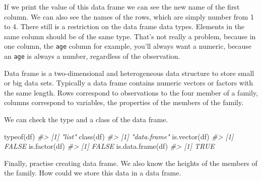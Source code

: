 \documentclass[
]{book}
\newenvironment{Shaded}{\begin{snugshade}}{\end{snugshade}}
\newcommand{\AttributeTok}[1]{\textcolor[rgb]{0.77,0.63,0.00}{#1}}
\newcommand{\CommentTok}[1]{\textcolor[rgb]{0.56,0.35,0.01}{\textit{#1}}}
\newcommand{\DecValTok}[1]{\textcolor[rgb]{0.00,0.00,0.81}{#1}}
\newcommand{\FloatTok}[1]{\textcolor[rgb]{0.00,0.00,0.81}{#1}}
\newcommand{\FunctionTok}[1]{\textcolor[rgb]{0.00,0.00,0.00}{#1}}
\newcommand{\NormalTok}[1]{#1}
\newcommand{\OtherTok}[1]{\textcolor[rgb]{0.56,0.35,0.01}{#1}}
\begin{document}
If we print the value of this data frame we can see the new name of the first column. We can also see the names of the rows, which are simply number from 1 to 4. There still is a restriction on the data frame data types. Elements in the same column should be of the same type. That's not really a problem, because in one column, the \texttt{age} column for example, you'll always want a numeric, because an \texttt{age} is always a number, regardless of the observation.

Data frame is a two-dimensional and heterogeneous data structure to store small or big data sets. Typically a data frame contains numeric vectors or factors with the same length. Rows correspond to observations to the four member of a family, columns correspond to variables, the properties of the members of the family.

We can check the type and a class of the data frame.

\begin{Shaded}
\begin{Highlighting}[]
\FunctionTok{typeof}\NormalTok{(df)}
\CommentTok{\#\textgreater{} [1] "list"}
\FunctionTok{class}\NormalTok{(df)}
\CommentTok{\#\textgreater{} [1] "data.frame"}
\FunctionTok{is.vector}\NormalTok{(df)}
\CommentTok{\#\textgreater{} [1] FALSE}
\FunctionTok{is.factor}\NormalTok{(df)}
\CommentTok{\#\textgreater{} [1] FALSE}
\FunctionTok{is.data.frame}\NormalTok{(df)}
\CommentTok{\#\textgreater{} [1] TRUE}
\end{Highlighting}
\end{Shaded}

Finally, practise creating data frame. We also know the heights of the members of the family. How could we store this data in a data frame.

\begin{Shaded}
\end{Shaded}
\end{document}
